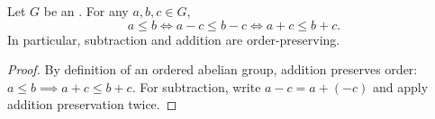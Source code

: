 \begin{proposition} \label{proposition:subtraction_preserves_order_in_ordered_group}
    Let $G$ be an . For any $a,b,c \in G$,
    $$a \le b \iff a - c \le b - c \iff a + c \le b + c.$$
    In particular, subtraction and addition are order-preserving.
\end{proposition}
\begin{proof}
    By definition of an ordered abelian group, addition preserves order: $a \le b \implies a + c \le b + c$. For subtraction, write $a - c = a + (-c)$ and apply addition preservation twice.
\end{proof}